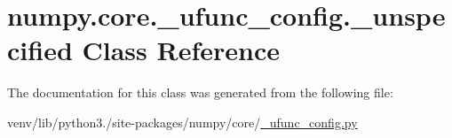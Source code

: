 \hypertarget{classnumpy_1_1core_1_1__ufunc__config_1_1__unspecified}{}\section{numpy.\+core.\+\_\+ufunc\+\_\+config.\+\_\+unspecified Class Reference}
\label{classnumpy_1_1core_1_1__ufunc__config_1_1__unspecified}


The documentation for this class was generated from the following file\+:\begin{DoxyCompactItemize}
\item 
venv/lib/python3./site-\/packages/numpy/core/\hyperlink{__ufunc__config_8py}{\+\_\+ufunc\+\_\+config.\+py}\end{DoxyCompactItemize}
